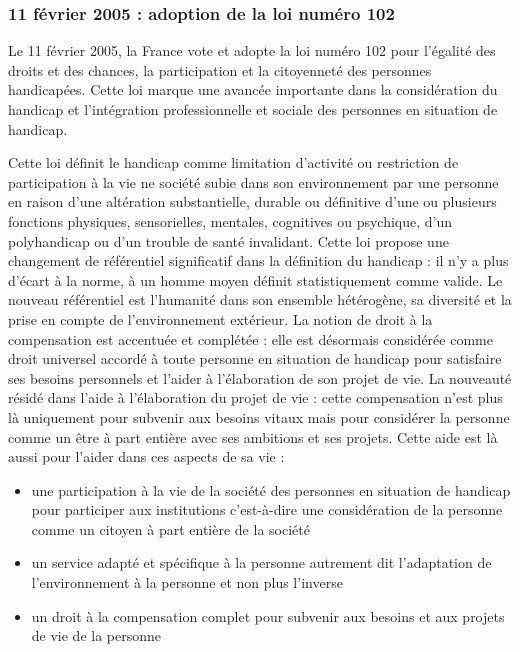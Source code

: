 \subsubsection{11 février 2005 : adoption de la loi numéro 102}

Le 11 février 2005, la France vote et adopte la loi numéro 102 \cite{loi2005.102} \og pour l'égalité des droits et des chances, la participation et la citoyenneté des personnes handicapées\fg . Cette loi marque une avancée importante dans la considération du handicap et l'intégration professionnelle et sociale des personnes en situation de handicap. 

Cette loi définit le handicap comme \og limitation d’activité ou restriction de participation à la vie ne société subie dans son environnement par une personne en raison d’une altération substantielle, durable ou définitive d’une ou plusieurs fonctions physiques, sensorielles, mentales, cognitives ou psychique, d’un polyhandicap ou d’un trouble de santé invalidant\fg . 
Cette loi propose une changement de référentiel significatif dans la définition du handicap : il n’y a plus d’écart à la norme, à un homme moyen définit statistiquement comme \og valide\fg. Le nouveau référentiel est l’humanité dans son ensemble hétérogène, sa diversité et la prise en compte de l’environnement extérieur.
La notion de droit à la compensation est accentuée et complétée : elle est désormais considérée comme droit universel accordé à toute personne en situation de handicap pour satisfaire ses besoins personnels et l’aider à l’élaboration de son projet de vie. La nouveauté résidé dans l'aide à l'élaboration du projet de vie : cette compensation n'est plus là uniquement pour subvenir aux besoins vitaux mais pour considérer la personne comme un être à part entière avec ses ambitions et ses projets. Cette aide est là aussi pour l'aider dans ces aspects de sa vie :



\begin{itemize}
\item une participation à la vie de la société des personnes en situation de handicap pour participer aux institutions c'est-à-dire une considération de la personne comme un citoyen à part entière de la société
\item un service adapté et spécifique à la personne autrement dit l'adaptation de l'environnement à la personne et non plus l'inverse
\item un droit à la compensation complet pour subvenir aux besoins et aux projets de vie de la personne
\end{itemize}

